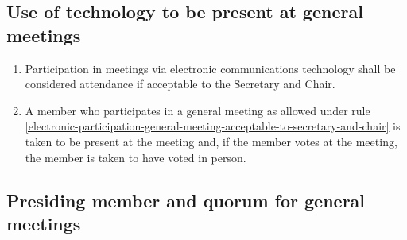 \documentclass[../constitution.tex]{subfiles}
\begin{document}
\hypertarget{use-of-technology-to-be-present-at-general-meetings}{%
\subsection{Use of technology to be present at general meetings}\label{use-of-technology-to-be-present-at-general-meetings}}

\begin{enumerate}

\item Participation in meetings via electronic communications technology shall be considered attendance if acceptable to the Secretary and Chair. \label{electronic-participation-general-meeting-acceptable-to-secretary-and-chair}
\item A member who participates in a general meeting as allowed under rule \ref{electronic-participation-general-meeting-acceptable-to-secretary-and-chair} is taken to be present at the meeting and, if the member votes at the meeting, the member is taken to have voted in person.
\end{enumerate}

\hypertarget{presiding-member-and-quorum-for-general-meetings}{%
\subsection{Presiding member and quorum for general meetings}\label{presiding-member-and-quorum-for-general-meetings}}
\end{document}
